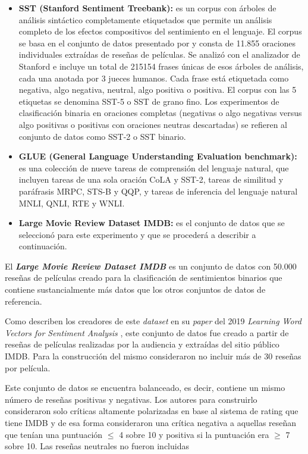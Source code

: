 \begin{itemize}
    \item \textbf{SST (Stanford Sentiment Treebank):} es un corpus con árboles de análisis sintáctico completamente etiquetados que permite un análisis completo de los efectos compositivos del sentimiento en el lenguaje. El corpus se basa en el conjunto de datos presentado por \citep{PANG_LEE_SST_https://doi.org/10.48550/arxiv.cs/0506075} y consta de 11.855 oraciones individuales extraídas de reseñas de películas. Se analizó con el analizador de Stanford e incluye un total de 215154 frases únicas de esos árboles de análisis, cada una anotada por 3 jueces humanos.
    Cada frase está etiquetada como negativa, algo negativa, neutral, algo positiva o positiva. El corpus con las 5 etiquetas se denomina SST-5 o SST de grano fino. Los experimentos de clasificación binaria en oraciones completas (negativas o algo negativas versus algo positivas o positivas con oraciones neutras descartadas) se refieren al conjunto de datos como SST-2 o SST binario.
    
     \item \textbf{GLUE (General Language Understanding Evaluation benchmark):} es una colección de nueve tareas de comprensión del lenguaje natural, que incluyen tareas de una sola oración CoLA y SST-2, tareas de similitud y paráfrasis MRPC, STS-B y QQP, y tareas de inferencia del lenguaje natural MNLI, QNLI, RTE y WNLI.
     
     \item \textbf{Large Movie Review Dataset IMDB:} es el conjunto de datos que se seleccionó para este experimento y que se procederá a describir a continuación.
\end{itemize}

El \textit{\textbf{Large Movie Review Dataset IMDB}} es un conjunto de datos con 50.000 reseñas de películas creado para la clasificación de sentimientos binarios que contiene sustancialmente más datos que los otros conjuntos de datos de referencia.

Como describen los creadores de este \textit{dataset} en su \textit{paper} del 2019 \textit{Learning Word Vectors for Sentiment Analysis} \cite{maas-EtAl:2011:ACL-HLT2011}, este conjunto de datos fue creado a partir de reseñas de películas realizadas por la audiencia y extraídas del sitio público IMDB. Para la construcción del mismo consideraron no incluir más de 30 reseñas por película.

Este conjunto de datos se encuentra balanceado, es decir, contiene un mismo número de reseñas positivas y negativas. Los autores para construirlo consideraron solo críticas altamente polarizadas en base al sistema de rating que tiene IMDB y de esa forma consideraron una crítica negativa a aquellas reseñan que tenían una puntuación $\leq$ 4 sobre 10 y positiva si la puntuación era $\geq$ 7 sobre 10. Las reseñas neutrales no fueron incluidas

